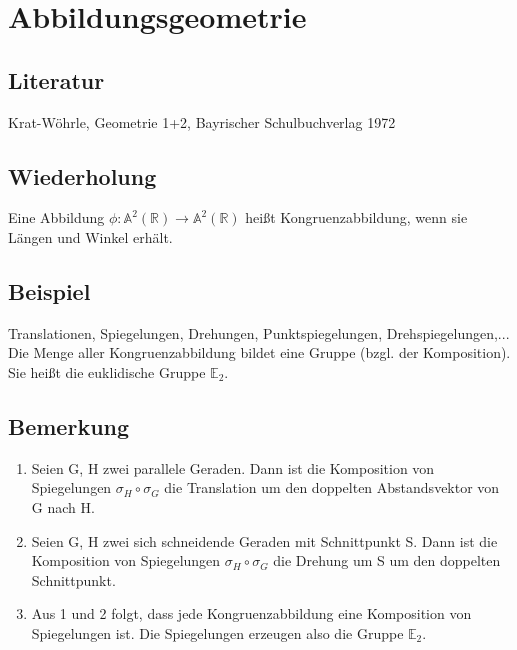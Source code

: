 \section{Abbildungsgeometrie}


\subsection{Literatur} Krat-Wöhrle, Geometrie 1+2, Bayrischer Schulbuchverlag 1972

\subsection{Wiederholung} Eine Abbildung $\phi: \mathbb{A}^2(\mathbb{R}) \rightarrow \mathbb{A}^2(\mathbb{R})$ heißt Kongruenzabbildung, wenn sie Längen und Winkel erhält.

\subsection{Beispiel} Translationen, Spiegelungen, Drehungen, Punktspiegelungen, Drehspiegelungen,...
Die Menge aller Kongruenzabbildung bildet eine Gruppe (bzgl. der Komposition). Sie heißt die euklidische Gruppe $\mathbb{E}_2$.

\subsection{Bemerkung}
\begin{enumerate}
	\item Seien G, H zwei parallele Geraden. Dann ist die Komposition von Spiegelungen $\sigma_H \circ \sigma_G$ die Translation um den doppelten Abstandsvektor von G nach H. 
	\item Seien G, H zwei sich schneidende Geraden mit Schnittpunkt S. Dann ist die Komposition von Spiegelungen $\sigma_H \circ \sigma_G$ die Drehung um S um den doppelten Schnittpunkt. 
	\item Aus 1 und 2 folgt, dass jede Kongruenzabbildung eine Komposition von Spiegelungen ist. Die Spiegelungen erzeugen also die Gruppe $\mathbb{E}_2$.
\end{enumerate}

